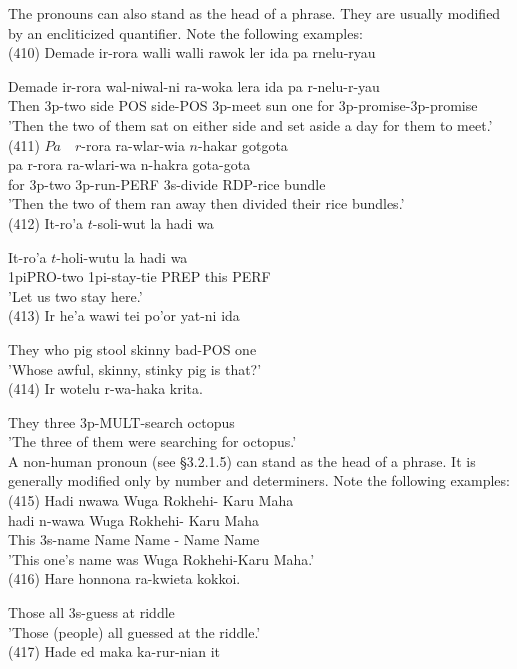 \documentclass[10pt]{article}
\begin{document}
The pronouns can also stand as the head of a phrase. They are usually modified by an encliticized quantifier. Note the following examples:\\
(410) Demade ir-rora walli walli rawok ler ida pa rnelu-ryau

Demade ir-rora wal-niwal-ni ra-woka lera ida pa r-nelu-r-yau\\
Then 3p-two side POS side-POS 3p-meet sun one for 3p-promise-3p-promise\\
'Then the two of them sat on either side and set aside a day for them to meet.'\\
(411) \(P a \quad r\)-rora ra-wlar-wia \(n\)-hakar gotgota\\
pa r-rora ra-wlari-wa n-hakra gota-gota\\
for 3p-two 3p-run-PERF 3s-divide RDP-rice bundle\\
'Then the two of them ran away then divided their rice bundles.'\\
(412) It-ro'a \(t\)-soli-wut la hadi wa

It-ro'a \(t\)-holi-wutu la hadi wa\\
1piPRO-two 1pi-stay-tie PREP this PERF\\
'Let us two stay here.'\\
(413) Ir he'a wawi tei po'or yat-ni ida

They who pig stool skinny bad-POS one\\
'Whose awful, skinny, stinky pig is that?'\\
(414) Ir wotelu r-wa-haka krita.

They three 3p-MULT-search octopus\\
'The three of them were searching for octopus.'\\
A non-human pronoun (see §3.2.1.5) can stand as the head of a phrase. It is generally modified only by number and determiners. Note the following examples:\\
(415) Hadi nwawa Wuga Rokhehi- Karu Maha\\
hadi n-wawa Wuga Rokhehi- Karu Maha\\
This 3s-name Name Name - Name Name\\
'This one's name was Wuga Rokhehi-Karu Maha.'\\
(416) Hare honnona ra-kwieta kokkoi.

Those all 3s-guess at riddle\\
'Those (people) all guessed at the riddle.'\\
(417) Hade ed maka ka-rur-nian it
\end{document}
